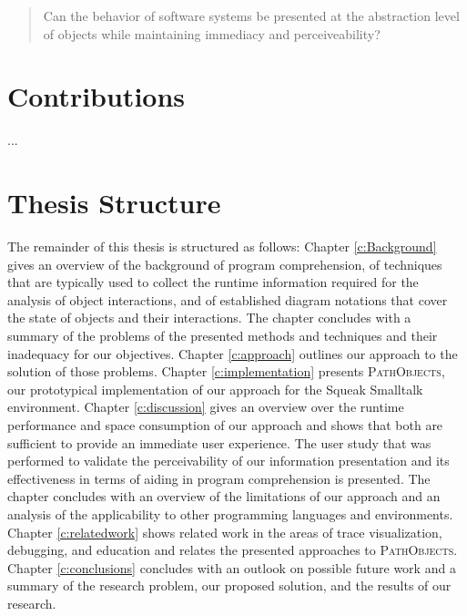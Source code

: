 \begin{quote}
Can the behavior of software systems be presented at the abstraction level of objects while maintaining immediacy and perceiveability?
\end{quote}

\section{Contributions}
\label{s:contributions}

\begin{description}[leftmargin=0pt]
\item[First Contribution]
...
\end{description}



\section{Thesis Structure}
The remainder of this thesis is structured as follows:
Chapter \ref{c:Background} gives an overview of the background of program comprehension, of techniques that are typically used to collect the runtime information required for the analysis of object interactions, and of established diagram notations that cover the state of objects and their interactions.
The chapter concludes with a summary of the problems of the presented methods and techniques and their inadequacy for our objectives.
Chapter \ref{c:approach} outlines our approach to the solution of those problems.
Chapter \ref{c:implementation} presents \textsc{PathObjects}, our prototypical implementation of our approach for the Squeak Smalltalk environment.
Chapter \ref{c:discussion} gives an overview over the runtime performance and space consumption of our approach and shows that both are sufficient to provide an immediate user experience.
The user study that was performed to validate the perceivability of our information presentation and its effectiveness in terms of aiding in program comprehension is presented.
The chapter concludes with an overview of the limitations of our approach and an analysis of the applicability to other programming languages and environments.
Chapter \ref{c:relatedwork} shows related work in the areas of trace visualization, debugging, and education and relates the presented approaches to \textsc{PathObjects}.
Chapter \ref{c:conclusions} concludes with an outlook on possible future work and a summary of the research problem, our proposed solution, and the results of our research.